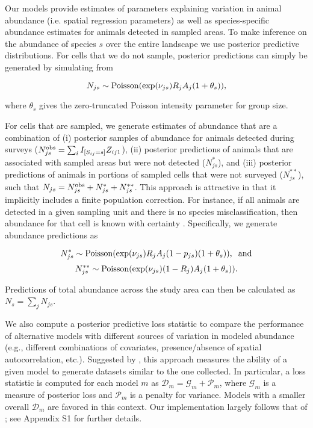 \documentclass[12pt,fleqn]{article}
\begin{document}
\begin{flushleft}
Our models provide estimates of parameters explaining variation in animal abundance (i.e. spatial regression parameters) as well
as species-specific abundance estimates for animals detected in sampled areas.  To make inference on the abundance of species $s$ over the entire landscape we use posterior predictive distributions.  For cells that we do not sample, posterior predictions can simply be generated by simulating from
\begin{linenomath*}
\begin{equation*}
  N_{js} \sim {\rm Poisson} (\exp(\nu_{js}) R_j A_j (1 + \theta_s)),
\end{equation*}
\end{linenomath*}
where $\theta_s$ gives the zero-truncated Poisson intensity parameter for group size.

\hspace{.5in}For cells that are sampled, we generate estimates of abundance that are a combination of (i) posterior
samples of abundance for animals detected during surveys ($N_{js}^{\rm obs}=\sum_i I_{[S_{ij}=s]}Z_{ij1}$), (ii) posterior predictions of animals that are associated with sampled areas but were not detected ($N_{js}^*$), and (iii) posterior predictions of animals in portions of sampled cells that were not surveyed ($N_{js}^{**}$), such that $N_{js} = N_{js}^{\rm obs}+N_{js}^*+N_{js}^{**}$.  This approach is attractive in that it implicitly includes a finite population correction.  For instance, if all animals are detected in a given sampling unit and there
is no species misclassification, then abundance for that cell is known with certainty \citep{VerHoef2008,JohnsonEtAl2010}.  Specifically, we generate abundance predictions as
\begin{linenomath*}
\begin{equation*}
  N_{js}^{*} \sim {\rm Poisson} (\exp(\nu_{js}) R_j A_j (1-p_{js}) (1 + \theta_s)), \hspace{2mm} {\rm and}
\end{equation*}
\begin{equation*}
  N_{js}^{**} \sim {\rm Poisson} (\exp(\nu_{js}) (1-R_j) A_j (1 + \theta_s)).
\end{equation*}
\end{linenomath*}
Predictions of total abundance across the study area can then be calculated as $N_s = \sum_j N_{js}$.

\hspace{.5in}We also compute a posterior predictive loss statistic to compare the performance of alternative models with different sources of variation in modeled abundance (e.g., different combinations of covariates,
presence/absence of spatial autocorrelation, etc.).  Suggested by \citet{GelfandGhosh1998}, this approach measures the ability of a given model to generate datasets similar to the one collected.  In particular, a loss statistic is computed for each model $m$ as $\mathcal{D}_m = \mathcal{G}_m + \mathcal{P}_m$,
where $\mathcal{G}_m$ is a measure of posterior loss and $\mathcal{P}_m$ is a penalty for variance.  Models with a smaller overall $\mathcal{D}_m$ are favored in this context.  Our implementation largely follows that of \citet{ConnEtAl2013}; see Appendix S1 for further details.


\end{flushleft}
\end{document}

